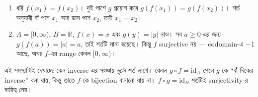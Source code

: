 \documentclass[11pt]{article}
\begin{document}
\begin{sol}
\begin{enumerate}
  \item ধরি $f(x_1) = f(x_2)$। দুই পাশে $g$ প্রয়োগ করে
        $g(f(x_1)) = g(f(x_2))$। শর্ত অনুযায়ী বাঁ পাশ $x_1$ আর ডান পাশ
        $x_2$, তাই $x_1 = x_2$।
  \item $A = [0, \infty)$, $B = \mathbb{R}$, $f(x) = x$ এবং $g(y) = |y|$
        নাও। সব $a \geq 0$-এর জন্য $g(f(a)) = |a| = a$, তাই শর্তটি মানা
        হয়েছে। কিন্তু $f$ surjective নয় --- codomain-এ $-1$ আছে, অথচ
        $f$-এর range কেবল $[0, \infty)$।
\end{enumerate}

এই সমস্যাটাই দেখাচ্ছে কেন inverse-এর সংজ্ঞায় \emph{দুটো} শর্ত লাগে। কেবল
$g \circ f = \mathrm{id}_A$ পেলে $g$-কে ``বাঁ দিকের inverse'' বলা যায়, কিন্তু
তাতে $f$-কে bijection বানানো যায় না। $f \circ g = \mathrm{id}_B$ শর্তটিই
surjectivity-র দায়িত্ব নেয়।
\end{sol}
\end{document}
